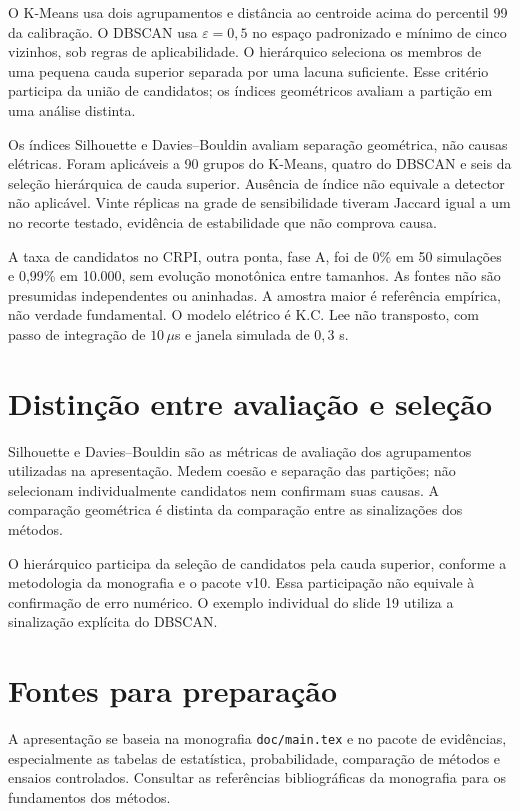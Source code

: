 \documentclass[11pt,a4paper]{article}
\begin{document}
O K-Means usa dois
agrupamentos e distância ao centroide acima do percentil 99 da calibração.
O DBSCAN usa $\varepsilon=0{,}5$ no espaço padronizado e mínimo de cinco
vizinhos, sob regras de aplicabilidade. O hierárquico seleciona os membros
de uma pequena cauda superior separada por uma lacuna suficiente.
Esse critério participa da união de candidatos; os índices geométricos
avaliam a partição em uma análise distinta.

Os índices Silhouette e Davies--Bouldin avaliam separação geométrica,
não causas elétricas. Foram aplicáveis a 90 grupos do K-Means, quatro do
DBSCAN e seis da seleção hierárquica de cauda superior. Ausência de índice
não equivale a detector não aplicável. Vinte réplicas na grade de
sensibilidade tiveram Jaccard igual a um no recorte testado, evidência
de estabilidade que não comprova causa.

A taxa de candidatos no CRPI, outra ponta, fase A, foi de 0\% em
50 simulações e 0,99\% em 10.000, sem evolução monotônica entre tamanhos. As fontes não são presumidas independentes
ou aninhadas. A amostra maior é referência empírica, não verdade fundamental.
O modelo elétrico é K.C. Lee não transposto, com passo de integração de
$10\,\mu$s e janela simulada de $0{,}3$ s.

\section*{Distinção entre avaliação e seleção}
Silhouette e Davies--Bouldin são as métricas de avaliação dos agrupamentos
utilizadas na apresentação. Medem coesão e separação das partições; não
selecionam individualmente candidatos nem confirmam suas causas.
A comparação geométrica é distinta da comparação entre as sinalizações
dos métodos.

O hierárquico participa da seleção de candidatos pela cauda superior,
conforme a metodologia da monografia e o pacote v10. Essa participação
não equivale à confirmação de erro numérico. O exemplo individual do
slide 19 utiliza a sinalização explícita do DBSCAN.

\section*{Fontes para preparação}
A apresentação se baseia na monografia \texttt{doc/main.tex} e no pacote
de evidências, especialmente as tabelas de estatística, probabilidade,
comparação de métodos e ensaios controlados. Consultar as referências
bibliográficas da monografia para os fundamentos dos métodos.
\end{document}
